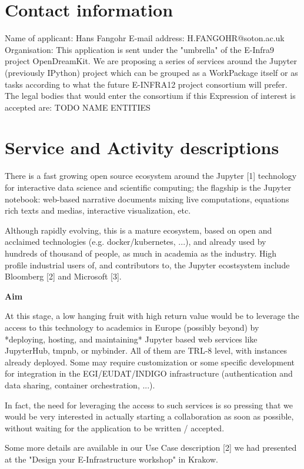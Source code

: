 \section{Contact information}

Name of applicant: Hans Fangohr
E-mail address: H.FANGOHR@soton.ac.uk
Organisation: This application is sent under the "umbrella" of the E-Infra9
project OpenDreamKit. We are proposing a series of services around the
Jupyter (previously IPython) project which can be grouped as a WorkPackage itself or as
tasks according to what the future E-INFRA12 project consortium will
prefer. The legal bodies that would enter the consortium if this Expression
of interest is accepted are: TODO NAME ENTITIES

\section{Service and Activity descriptions}

There is a fast growing open source ecosystem around the Jupyter [1]
technology for interactive data science and scientific computing; the
flagship is the Jupyter notebook: web-based narrative documents mixing
live computations, equations rich texts and medias, interactive
visualization, etc.

Although rapidly evolving, this is a mature ecosystem, based on open
and acclaimed technologies (e.g. docker/kubernetes, ...), and already
used by hundreds of thousand of people, as much in academia as the
industry. High profile industrial users of, and contributors to, the Jupyter ecostsystem include Bloomberg [2] and Microsoft [3].

\textbf{Aim}

At this stage, a low hanging fruit with high return value would be to
leverage the access to this technology to academics in Europe
(possibly beyond) by *deploying, hosting, and maintaining* Jupyter
based web services like JupyterHub, tmpnb, or mybinder. All of them
are TRL-8 level, with instances already deployed. Some may require
customization or some specific development for integration in the
EGI/EUDAT/INDIGO infrastructure (authentication and data sharing,
container orchestration, ...).

In fact, the need for leveraging the access to such services is so
pressing that we would be very interested in actually starting a
collaboration as soon as possible, without waiting for the application
to be written / accepted.

Some more details are available in our Use Case description [2] we had
presented at the "Design your E-Infrastructure workshop" in Krakow.

